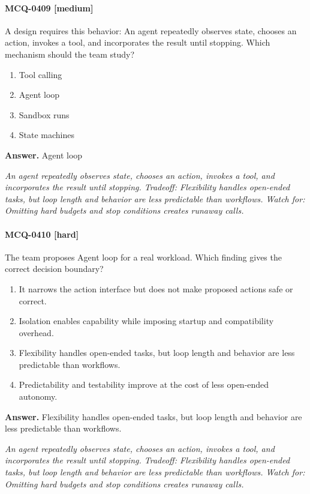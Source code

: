 \paragraph{MCQ-0409 [medium]} A design requires this behavior: An agent repeatedly observes state, chooses an action, invokes a tool, and incorporates the result until stopping. Which mechanism should the team study?
\begin{enumerate}[label=\Alph*.]
\item Tool calling
\item Agent loop
\item Sandbox runs
\item State machines
\end{enumerate}
\noindent\textbf{Answer.} Agent loop
\par\textit{An agent repeatedly observes state, chooses an action, invokes a tool, and incorporates the result until stopping. Tradeoff: Flexibility handles open-ended tasks, but loop length and behavior are less predictable than workflows. Watch for: Omitting hard budgets and stop conditions creates runaway calls.}
\paragraph{MCQ-0410 [hard]} The team proposes Agent loop for a real workload. Which finding gives the correct decision boundary?
\begin{enumerate}[label=\Alph*.]
\item It narrows the action interface but does not make proposed actions safe or correct.
\item Isolation enables capability while imposing startup and compatibility overhead.
\item Flexibility handles open-ended tasks, but loop length and behavior are less predictable than workflows.
\item Predictability and testability improve at the cost of less open-ended autonomy.
\end{enumerate}
\noindent\textbf{Answer.} Flexibility handles open-ended tasks, but loop length and behavior are less predictable than workflows.
\par\textit{An agent repeatedly observes state, chooses an action, invokes a tool, and incorporates the result until stopping. Tradeoff: Flexibility handles open-ended tasks, but loop length and behavior are less predictable than workflows. Watch for: Omitting hard budgets and stop conditions creates runaway calls.}
